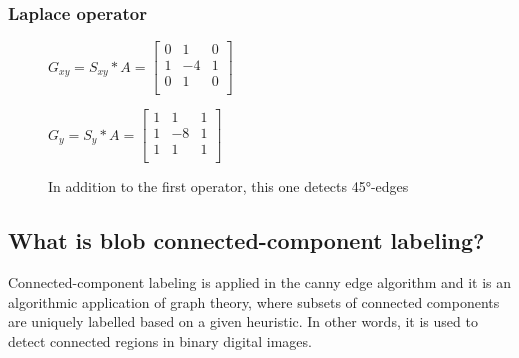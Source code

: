 \subsubsection{Laplace operator}

\begin{figure}[!htb]
    \centering
    \begin{minipage}{.5\textwidth}
        \centering
        $G_{xy} = S_{xy} * A =
        \left[ \begin{array}{rrr}
        0 & 1 & 0 \\
        1 & -4 & 1 \\
        0 & 1 & 0 \\
        \end{array}\right] $
    \end{minipage}%
    \begin{minipage}{.5\textwidth}
        \centering
        $G_{y} = S_{y} * A =
        \left[ \begin{array}{rrr}
        1 & 1 & 1 \\
        1 & -8 & 1 \\
        1 & 1 & 1 \\
        \end{array}\right] $
    \end{minipage}
    \caption{In addition to the first operator, this one detects 45°-edges}
\end{figure}




\subsection{What is blob connected-component labeling?}
Connected-component labeling is applied in the canny edge algorithm and it is an algorithmic application of graph theory, where subsets of connected components are uniquely labelled based on a given heuristic. In other words, it is used to detect connected regions in binary digital images.


